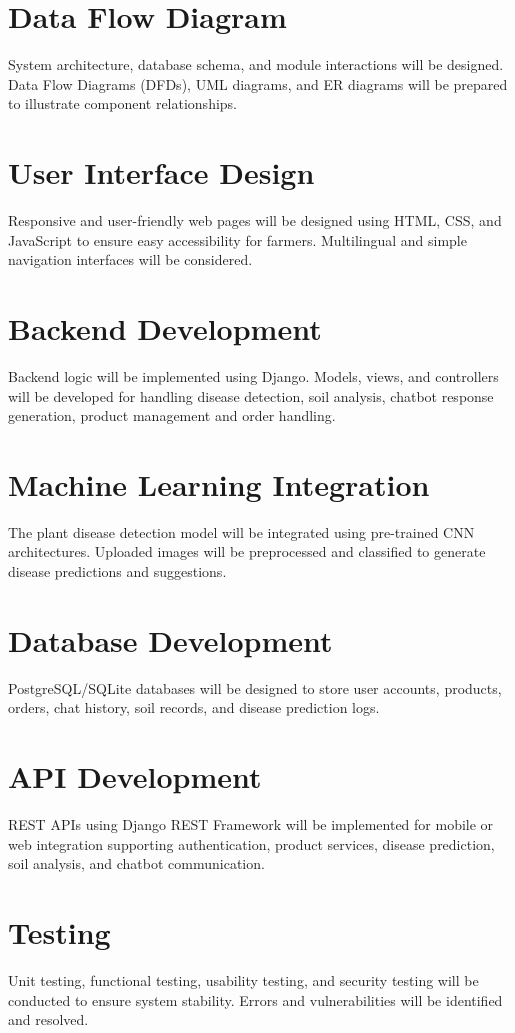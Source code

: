 \section{Data Flow Diagram}
System architecture, database schema, and module interactions will be designed. Data Flow
Diagrams (DFDs), UML diagrams, and ER diagrams will be prepared to illustrate component relationships.
 \section{User Interface Design}
Responsive and user-friendly web pages will be designed using HTML, CSS, and JavaScript to
ensure easy accessibility for farmers. Multilingual and simple navigation interfaces will be
considered. 
\section{Backend Development}
Backend logic will be implemented using Django. Models, views, and controllers will be developed
for handling disease detection, soil analysis, chatbot response generation, product management and
order handling.
\section{ Machine Learning Integration}
The plant disease detection model will be integrated using pre-trained CNN architectures. Uploaded
images will be preprocessed and classified to generate disease predictions and suggestions. 
\section{Database Development}
PostgreSQL/SQLite databases will be designed to store user accounts, products, orders, chat history, soil records, and disease prediction logs. 
\section{API Development}
REST APIs using Django REST Framework will be implemented for mobile or web integration
supporting authentication, product services, disease prediction, soil analysis, and chatbot
communication. 
\section{Testing}
Unit testing, functional testing, usability testing, and security testing will be conducted to ensure
system stability. Errors and vulnerabilities will be identified and resolved. 
